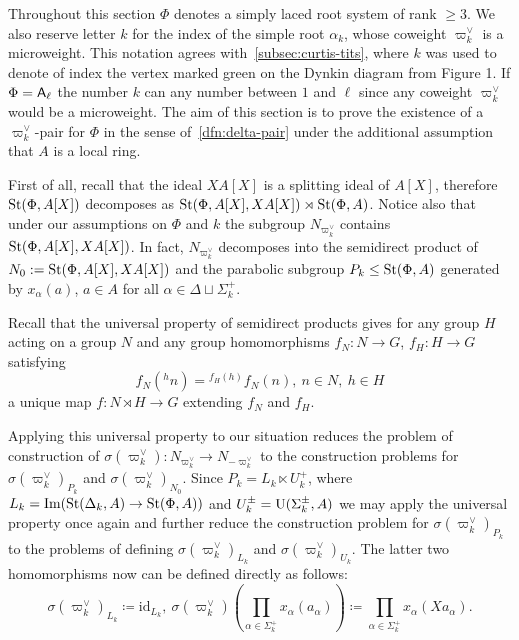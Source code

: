 Throughout this section $\Phi$ denotes a simply laced root system of rank $\geq 3$.
We also reserve letter $k$ for the index of the simple root $\alpha_k$, whose coweight $\varpi_k^\vee$ is a microweight.
This notation agrees with~\cref{subsec:curtis-tits}, where $k$ was used to denote of index the vertex marked green on the Dynkin diagram from Figure 1.
If $\Phi = \mathsf{A}_\ell$ the number $k$ can any number between $1$ and $\ell$ since any coweight $\varpi_k^\vee$ would be a microweight.
The aim of this section is to prove the existence of a $\varpi_k^\vee$-pair for $\Phi$ in the sense of~\cref{dfn:delta-pair} under the additional assumption that $A$ is a local ring.

First of all, recall that the ideal $XA[X]$ is a splitting ideal of $A[X]$, therefore
$\operatorname{St}(\Phi, A[X])$ decomposes as $\operatorname{St}(\Phi, A[X], XA[X]) \rtimes \operatorname{St}(\Phi, A)$.
Notice also that under our assumptions on $\Phi$ and $k$ the subgroup $N_{\varpi_k^\vee}$ contains $\operatorname{St}(\Phi, A[X], XA[X])$.
In fact, $N_{\varpi_k^\vee}$ decomposes into the semidirect product of $N_0 := \operatorname{St}(\Phi, A[X], XA[X])$ and the parabolic subgroup $P_k \leq \operatorname{St}(\Phi, A)$
generated by $x_\alpha(a)$, $a \in A$ for all $\alpha \in \Delta \sqcup \Sigma^+_k$.

Recall that the universal property of semidirect products gives for any group $H$ acting on a group $N$
and any group homomorphisms $f_N\colon N \to G$, $f_H\colon H \to G$ satisfying
\begin{equation}
    \label{eq:coherence-condition} f_N({}^hn) = {}^{f_H(h)} f_N(n),\ n\in N,\ h\in H
\end{equation}
a unique map $f\colon N \rtimes H \to G$ extending $f_N$ and $f_H$.

Applying this universal property to our situation reduces the problem of construction of $\sigma(\varpi_k^\vee) \colon N_{\varpi_k^\vee} \to N_{-\varpi_k^\vee}$
to the construction problems for $\sigma(\varpi_k^\vee)_{P_k}$ and $\sigma(\varpi_k^\vee)_{N_0}$.
Since $P_k = L_k \ltimes U_k^+$, where $L_k = \mathrm{Im}(\operatorname{St}(\Delta_k, A) \to \operatorname{St}(\Phi, A))$
and $U_k^\pm = \operatorname{U}(\Sigma_k^\pm, A)$ we may apply the universal property once again and further reduce the construction problem for $\sigma(\varpi_k^\vee)_{P_k}$
to the problems of defining $\sigma(\varpi_k^\vee)_{L_k}$ and $\sigma(\varpi_k^\vee)_{U_k}$.
The latter two homomorphisms now can be defined directly as follows:
\[\sigma(\varpi_k^\vee)_{L_k} \coloneqq \mathrm{id}_{L_k},\ \sigma(\varpi_k^\vee)\left(\prod\limits_{\alpha \in \Sigma_k^+} x_\alpha(a_\alpha)\right) \coloneqq \prod\limits_{\alpha \in \Sigma_k^+} x_\alpha(Xa_\alpha).\]

